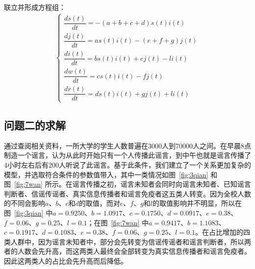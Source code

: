 \documentclass[withoutpreface,bwprint]{cumcmthesis}
\begin{document}
联立并形成方程组：
\begin{align*}
	\begin{cases}
		\dfrac{ds(t)}{dt} = -(a+b+c+d)s(t)i(t)\\
		\dfrac{dj(t)}{dt} = as(t)i(t)-(e+f+g)j(t)\\
		\dfrac{di(t)}{dt} = bs(t)i(t)+ej(t)-li(t)\\
		\dfrac{dw(t)}{dt} = cs(t)i(t)-fj(t)\\
		\dfrac{dr(t)}{dt} = ds(t)i(t) + gj(t) + li(t)
	\end{cases}
\end{align*}

\subsection{问题二的求解}
通过查阅相关资料，一所大学的学生人数普遍在3000人到70000人之间。在早晨8点制造一个谣言，认为从此时开始只有一个人传播此谣言，到中午也就是谣言传播了4小时左右后有200人听说了此谣言。基于此条件，我们建立了一个关系更加复杂的模型，并选取符合条件的参数值带入，其中一类情况如图~\ref{fig:3qian} 和图~\ref{fig:7wan} 所示。在谣言传播之初，谣言未知者会同时向谣言未知者、已知谣言判断者、信谣传谣者、真实信息传播者和谣言免疫者这五类人转变。因为全校人数的不同会影响$a$、$b$、$c$和$d$的取值，而对$e$、$f$、$g$和$l$的取值影响并不明显，所以在图~\ref{fig:3qian}  中$a=0.9250$、$b=1.0917$、$c=0.1750$、$d=0.0917
$、$e=0.38$、$f=0.06$、$g=0.25$、$l=0.1$；在图~\ref{fig:7wan}  中$a=0.9417$、$b=1.1083$、$c=0.1917$、$d=0.1083$、$e=0.38$、$f=0.06$、$g=0.25$、$l=0.1$。在占比增加的四类人群中，因为谣言未知者中，部分会先转变为信谣传谣者和谣言判断者，所以两者的人数会先升高，而这两类人最终会全部转变为真实信息传播者和谣言免疫者。因此这两类人的占比会先升高而后降低。
\end{document}
